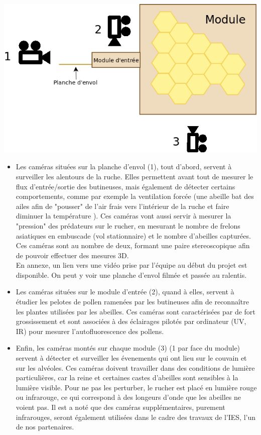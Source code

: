 \documentclass[11pt,french,a4paper]{report}
\begin{document}
\begin{center}
\includegraphics[scale=0.3]{../images/dia/schema_camera.png}
\end{center}
\begin{itemize}

  \item Les caméras situées sur la planche d'envol (1), tout d'abord, servent à surveiller 
  les alentours de la ruche. Elles permettent avant tout de
  mesurer le flux d'entrée/sortie des butineuses, mais également de détecter
  certains comportements, comme par exemple la ventilation forcée (une abeille
  bat des ailes afin de "pousser" de l'air frais vers l'intérieur de la ruche et faire
  diminuer la température ). Ces caméras vont aussi servir à mesurer la
  "pression" des prédateurs sur le rucher, en mesurant le nombre de frelons
  asiatiques en embuscade (vol stationnaire) et le nombre d'abeilles
  capturées. Ces caméras sont au nombre de deux, formant une paire
  stereoscopique afin de pouvoir effectuer des mesures 3D. \\
  En annexe, un lien vers une vidéo prise par l'équipe au début du projet est disponible. 
  On peut y voir une planche d'envol filmée et passée au ralentis. \\ 
 
  \item Les caméras situées sur le module d'entrée (2), quand à elles, servent à étudier
  les pelotes de pollen ramenées par les butineuses afin de reconnaître les
  plantes utilisées par les abeilles. Ces caméras sont caractérisées par de
  fort grossissement et sont associées à des éclairages pilotés par ordinateur
  (UV, IR) pour mesurer l'autofluorescence des pollens.

  \item Enfin, les caméras montés sur chaque module (3) (1 par face du module) servent
  à détecter et surveiller les évenements qui ont lieu sur le couvain et sur
  les alvéoles. Ces caméras doivent travailler dans des conditions de lumière
  particulières, car la reine et certaines castes d'abeilles sont sensibles à
  la lumière visible. Pour ne pas les perturber, le rucher est placé en
  lumière rouge ou infrarouge, ce qui correspond à des longeurs d'onde que les
  abeilles ne voient pas. Il est a noté que des caméras supplémentaires,
  purement infrarouges, seront également utilisées dans le cadre des travaux de
  l'IES, l'un de nos partenaires.
\end{itemize}
\end{document}
